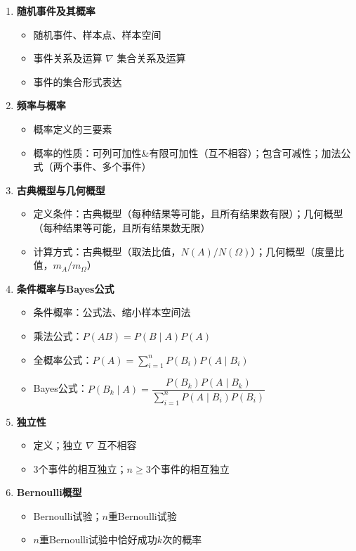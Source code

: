 \documentclass[11pt,a4paper]{report}
\theoremstyle{definition}
\theoremstyle{plain}
\begin{document}
\begin{enumerate}[label=\arabic*.,leftmargin=2em]
    \item \textbf{随机事件及其概率}
    \begin{itemize}
        \item 随机事件、样本点、样本空间
        \item 事件关系及运算 $\nabla$ 集合关系及运算
        \item 事件的集合形式表达
    \end{itemize}
    \item \textbf{频率与概率}
    \begin{itemize}
        \item 概率定义的三要素
        \item 概率的性质：可列可加性\&有限可加性（互不相容）；包含可减性；加法公式（两个事件、多个事件）
    \end{itemize}
    \item \textbf{古典概型与几何概型}
    \begin{itemize}
        \item 定义条件：古典概型（每种结果等可能，且所有结果数有限）；几何概型（每种结果等可能，且所有结果数无限）
        \item 计算方式：古典概型（取法比值，$N(A)/N(\Omega)$）；几何概型（度量比值，$m_A/m_\Omega$）
    \end{itemize}
    \item \textbf{条件概率与Bayes公式}
    \begin{itemize}
        \item 条件概率：公式法、缩小样本空间法
        \item 乘法公式：$P(AB)=P(B\mid A)P(A)$
        \item 全概率公式：$P(A)=\sum_{i=1}^{n}P(B_i)P(A\mid B_i)$
        \item Bayes公式：$P(B_k\mid A)=\dfrac{P(B_k)P(A\mid B_k)}{\sum_{i=1}^{n}P(A\mid B_i)P(B_i)}$
    \end{itemize}
    \item \textbf{独立性}
    \begin{itemize}
        \item 定义；独立 $\nabla$ 互不相容
        \item 3个事件的相互独立；$n\geq3$个事件的相互独立
    \end{itemize}
    \item \textbf{Bernoulli概型}
    \begin{itemize}
        \item Bernoulli试验；$n$重Bernoulli试验
        \item $n$重Bernoulli试验中恰好成功$k$次的概率
    \end{itemize}
\end{enumerate}
\end{document}
